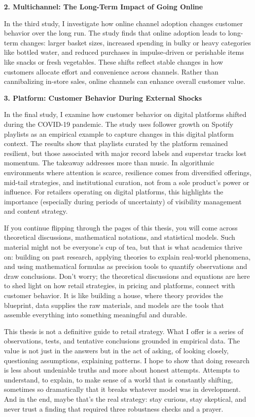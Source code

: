 \textbf{2. Multichannel: The Long-Term Impact of Going Online}

In the third study, I investigate how online channel adoption changes customer behavior over the long run. The study finds that online adoption leads to long-term changes: larger basket sizes, increased spending in bulky or heavy categories like bottled water, and reduced purchases in impulse-driven or perishable items like snacks or fresh vegetables. These shifts reflect stable changes in how customers allocate effort and convenience across channels. Rather than cannibalizing in-store sales, online channels can enhance overall customer value.

\textbf{3. Platform: Customer Behavior During External Shocks}

In the final study, I examine how customer behavior on digital platforms shifted during the COVID-19 pandemic. The study uses follower growth on Spotify playlists as an empirical example to capture changes in this digital platform context. The results show that playlists curated by the platform remained resilient, but those associated with major record labels and superstar tracks lost momentum. The takeaway addresses more than music. In algorithmic environments where attention is scarce, resilience comes from diversified offerings, mid-tail strategies, and institutional curation, not from a sole product’s power or influence. For retailers operating on digital platforms, this highlights the importance (especially during periods of uncertainty) of visibility management and content strategy.

If you continue flipping through the pages of this thesis, you will come across theoretical discussions, mathematical notations, and statistical models. Such material might not be everyone’s cup of tea, but that is what academics thrive on: building on past research, applying theories to explain real-world phenomena, and using mathematical formulas as precision tools to quantify observations and draw conclusions. Don’t worry; the theoretical discussions and equations are here to shed light on how retail strategies, in pricing and platforms, connect with customer behavior. It is like building a house, where theory provides the blueprint, data supplies the raw materials, and models are the tools that assemble everything into something meaningful and durable.

This thesis is not a definitive guide to retail strategy. What I offer is a series of observations, tests, and tentative conclusions grounded in empirical data. The value is not just in the answers but in the act of asking, of looking closely, questioning assumptions, explaining patterns. I hope to show that doing research is less about undeniable truths and more about honest attempts. Attempts to understand, to explain, to make sense of a world that is constantly shifting, sometimes so dramatically that it breaks whatever model was in development. And in the end, maybe that’s the real strategy: stay curious, stay skeptical, and never trust a finding that required three robustness checks and a prayer.





